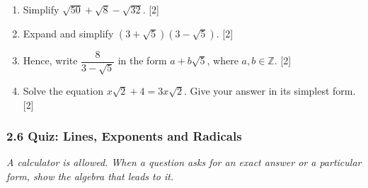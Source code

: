 \documentclass[12pt, twoside]{article}
\begin{document}
\begin{enumerate}[itemsep=0.15cm]
\begin{enumerate}[itemsep=0.1cm]
  \item Simplify $\sqrt{50} + \sqrt{8} - \sqrt{32}$. \hfill [2]
  \item Expand and simplify $\left(3 + \sqrt{5}\right)\left(3 - \sqrt{5}\right)$.
  \hfill [2]
  \item Hence, write $\dfrac{8}{3 - \sqrt{5}}$ in the form $a + b\sqrt{5}$,
  where $a, b \in \mathbb{Z}$. \hfill [2]
  \item Solve the equation $x\sqrt{2} + 4 = 3x\sqrt{2}$. Give your answer
  in its simplest form. \hfill [2]
\end{enumerate}


\end{enumerate}

\newpage

\subsubsection*{2.6 Quiz: Lines, Exponents and Radicals}

\emph{A calculator is allowed. When a question asks for an exact answer or
a particular form, show the algebra that leads to it.}
\end{document}
